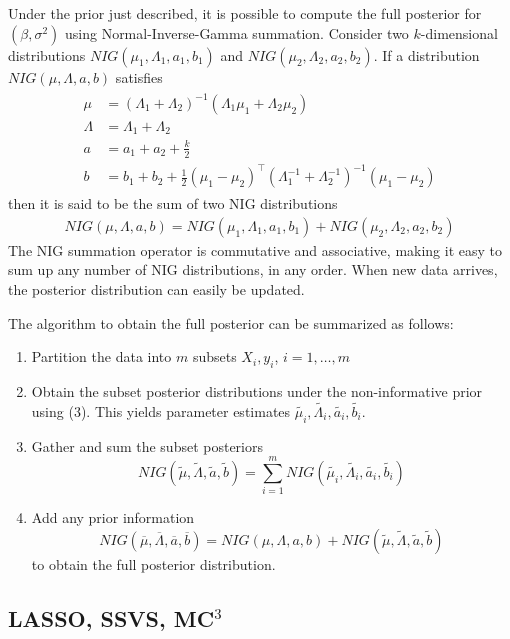 \documentclass[12pt]{article}
\begin{document}
Under the prior just described, it is possible to compute the full posterior for $(\beta,\sigma^2)$ using Normal-Inverse-Gamma summation. Consider two $k$-dimensional distributions $NIG(\mu_1, \Lambda_1, a_1, b_1)$ and $NIG(\mu_2, \Lambda_2, a_2, b_2)$. If a distribution $NIG(\mu, \Lambda, a, b)$ satisfies
\begin{align}
\begin{split}
\mu &=(\Lambda_1+\Lambda_2)^{-1}(\Lambda_1\mu_1 + \Lambda_2\mu_2) \\
\Lambda &=\Lambda_1+\Lambda_2 \\
a &=a_1+a_2+\frac{k}{2} \\
b &=b_1+b_2+\frac{1}{2}(\mu_1-\mu_2)^\top(\Lambda_1^{-1}+\Lambda_2^{-1})^{-1}(\mu_1-\mu_2)
\end{split}
\end{align}
then it is said to be the sum of two NIG distributions
\begin{align}
NIG(\mu, \Lambda, a, b) = NIG(\mu_1, \Lambda_1, a_1, b_1) + NIG(\mu_2, \Lambda_2, a_2, b_2)
\end{align}
The NIG summation operator is commutative and associative, making it easy to sum up any number of NIG distributions, in any order. When new data arrives, the posterior distribution can easily be updated.

The algorithm to obtain the full posterior can be summarized as follows:
\begin{enumerate}
\item Partition the data into $m$ subsets $X_i,y_i$, $i=1,\ldots,m$
\item Obtain the subset posterior distributions under the non-informative prior using (3). This yields parameter estimates $\tilde{\mu_i}, \tilde{\Lambda_i}, \tilde{a_i}, \tilde{b_i}$.
\item Gather and sum the subset posteriors
\[ NIG(\tilde{\mu}, \tilde{\Lambda}, \tilde{a}, \tilde{b}) = \sum_{i=1}^m NIG(\tilde{\mu_i}, \tilde{\Lambda_i}, \tilde{a_i}, \tilde{b_i}) \]
\item Add any prior information
\[ NIG(\overline{\mu},\overline{\Lambda}, \overline{a}, \overline{b}) = NIG(\mu,\Lambda,a,b)+NIG(\tilde{\mu}, \tilde{\Lambda}, \tilde{a}, \tilde{b}) \]
to obtain the full posterior distribution.
\end{enumerate}

\subsection{LASSO, SSVS, MC$^3$}
\end{document}
